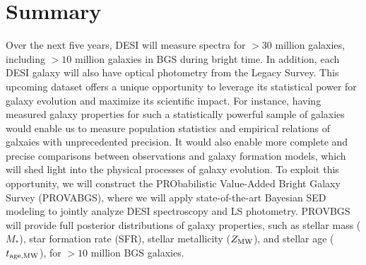 \section{Summary}
Over the next five years, DESI will measure spectra for ${>}30$ million
galaxies, including ${>}10$ million galaxies in BGS during bright time.
In addition, each DESI galaxy will also have optical photometry from the Legacy
Survey. 
This upcoming dataset offers a unique opportunity to leverage its statistical
power for galaxy evolution and maximize its scientific impact. 
For instance, having measured galaxy properties for such a statistically
powerful sample of galaxies would enable us to measure population statistics
and empirical relations of galxaies with unprecedented precision. 
It would also enable more complete and precise comparisons between observations
and galaxy formation models, which will shed light into the physical processes
of galaxy evolution.
To exploit this opportunity, we will construct the PRObabilistic Value-Added
Bright Galaxy Survey (PROVABGS), where we will apply state-of-the-art Bayesian
SED modeling to jointly analyze DESI spectroscopy and LS photometry. 
PROVBGS will provide full posterior distributions of galaxy properties, such as
stellar mass ($M_*$), star formation rate (SFR), stellar metallicity 
($Z_{\rm MW}$), and stellar age ($t_{\rm age, MW}$), for ${>}10$ million BGS galaxies.


